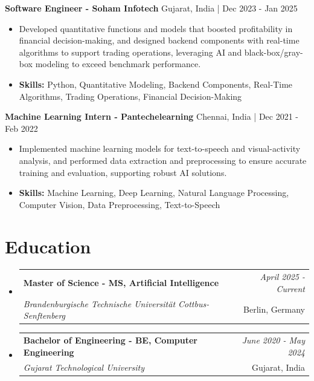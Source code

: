 \documentclass[a4paper,11pt]{article}
\makeatletter
\newcommand{\resumeSubheading}[4]{
\vspace{0.5mm}\item
    \begin{tabular*}{0.98\textwidth}[t]{l@{\extracolsep{\fill}}r}
        \textbf{#1} & \textit{\footnotesize{#4}} \\
        \textit{\footnotesize{#3}} &  \footnotesize{#2}\\
    \end{tabular*}
    \vspace{-2.4mm}
}
\makeatother
\begin{document}
\vspace{1mm}
  \textbf{Software Engineer - Soham Infotech} \hfill Gujarat, India | Dec 2023 - Jan 2025
\vspace{-1.5mm} %
\begin{itemize}
  \item Developed quantitative functions and models that boosted profitability in financial decision-making, and designed backend components with real-time algorithms to support trading operations, leveraging AI and black-box/gray-box modeling to exceed benchmark performance.

\vspace{-2mm}
  \item \textbf{Skills:} Python, Quantitative Modeling, Backend Components, Real-Time Algorithms, Trading Operations, Financial Decision-Making
\end{itemize}

\vspace{1mm}
  \textbf{Machine Learning Intern - Pantechelearning} \hfill Chennai, India | Dec 2021 - Feb 2022
\vspace{-1.5mm} %
\begin{itemize}
  \item Implemented machine learning models for text-to-speech and visual-activity analysis, and performed data extraction and preprocessing to ensure accurate training and evaluation, supporting robust AI solutions.
\vspace{-2mm}
  \item \textbf{Skills:} Machine Learning, Deep Learning, Natural Language Processing, Computer Vision, Data Preprocessing, Text-to-Speech
\end{itemize}\section{\textbf{Education}}
\vspace{-0.4mm}

\begin{itemize}
\resumeSubheading
{Master of Science - MS, Artificial Intelligence }{Berlin, Germany}
{Brandenburgische Technische Universität Cottbus-Senftenberg  }{April 2025 - Current}

\vspace{1.0mm} %
\resumeSubheading
{Bachelor of Engineering - BE, Computer Engineering  }{Gujarat, India}
{Gujarat Technological University }{June 2020 - May 2024}

\end{itemize}
\end{document}
